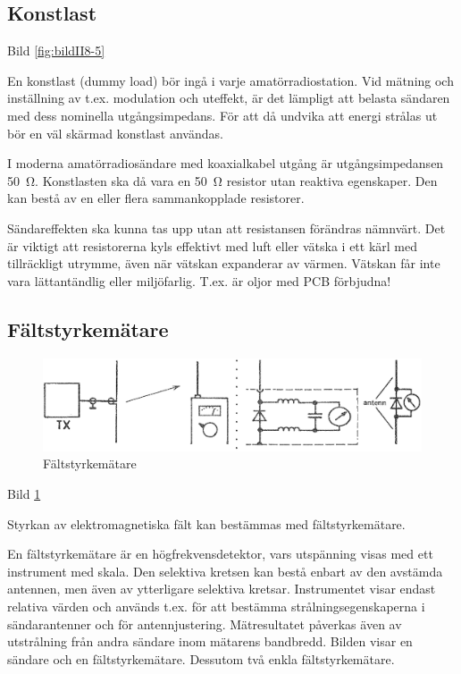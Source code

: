 \subsection{Konstlast}

Bild \ref{fig:bildII8-5}

En konstlast (dummy load) bör ingå i varje amatörradiostation.  Vid
mätning och inställning av t.ex. modulation och uteffekt, är det
lämpligt att belasta sändaren med dess nominella utgångsimpedans.  För
att då undvika att energi strålas ut bör en väl skärmad konstlast
användas.

I moderna amatörradiosändare med koaxialkabel utgång är
utgångsimpedansen 50~Ω.
Konstlasten ska då vara en 50~Ω resistor utan reaktiva egenskaper.
Den kan bestå av en eller flera sammankopplade resistorer.

Sändareffekten ska kunna tas upp utan att resistansen förändras
nämnvärt. Det är viktigt att resistorerna kyls effektivt med luft
eller vätska i ett kärl med tillräckligt utrymme, även när vätskan
expanderar av värmen.  Vätskan får inte vara lättantändlig eller
miljöfarlig.  T.ex. är oljor med PCB förbjudna!

\subsection{Fältstyrkemätare}

\begin{figure}
  \includegraphics[width=\textwidth]{images/cropped_pdfs/bild_2_8-06.pdf}
  \caption{Fältstyrkemätare}
  \label{fig:bildII8-6}
\end{figure}

Bild \ref{fig:bildII8-6}

Styrkan av elektromagnetiska fält kan bestämmas med fältstyrkemätare.

En fältstyrkemätare är en högfrekvensdetektor, vars utspänning visas
med ett instrument med skala.  Den selektiva kretsen kan bestå enbart
av den avstämda antennen, men även av ytterligare selektiva
kretsar. Instrumentet visar endast relativa värden och används
t.ex. för att bestämma strålningsegenskaperna i sändarantenner och för
antennjustering.  Mätresultatet påverkas även av utstrålning från
andra sändare inom mätarens bandbredd.  Bilden visar en sändare och en
fältstyrkemätare.  Dessutom två enkla fältstyrkemätare.

